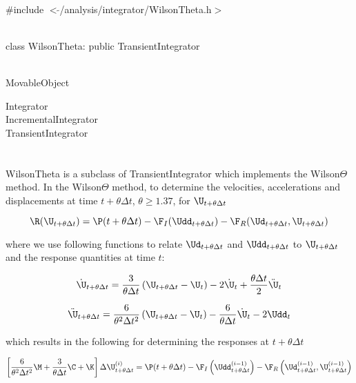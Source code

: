
   \\
\#include $<\tilde{ }$/analysis/integrator/WilsonTheta.h$>$  


  \\
class WilsonTheta: public TransientIntegrator  


 \\
MovableObject 

\indent\indent Integrator \\
\indent\indent\indent IncrementalIntegrator \\
\indent\indent\indent\indent TransientIntegrator \\
\indent\indent\indent\indent{} \\

 \\ 
\indent WilsonTheta is a subclass of TransientIntegrator which implements
the Wilson$\Theta$ method. In the Wilson$\Theta$ method, to determine the 
velocities, accelerations and displacements at time $t + \theta \Delta
t$, $\theta \ge 1.37$, for $\U_{t+ \theta \Delta t}$ 

\[ \R (\U_{t + \theta \Delta t}) = \P(t + \theta \Delta t) -
\F_I(\Udd_{t+ \theta \Delta t}) 
- \F_R(\Ud_{t + \theta \Delta t},\U_{t + \theta \Delta t}) \]

\noindent where we use following functions to relate $\Ud_{t + \theta
\Delta t}$ and $\Udd_{t + \theta \Delta t}$ to $\U_{t + \theta \Delta
t}$ and the response quantities at time $t$:

\[
\dot \U_{t + \theta \Delta t} = \frac{3}{\theta \Delta t} \left(
\U_{t + \theta \Delta t} - \U_t \right)
 - 2 \dot \U_t + \frac{\theta \Delta t}{2} \ddot \U_t 
\]

\[
\ddot \U_{t + \theta \Delta t} = \frac{6}{\theta^2 \Delta t^2}
\left( \U_{t+\theta \Delta t} - \U_t \right)
 - \frac{6}{\theta \Delta t} \dot \U_t -2 \Udd_t
\]

\noindent which  results in the following for determining the responses at
$t + \theta \Delta t$ 

\[ \left[ \frac{6}{\theta^2 \Delta t^2} \M + \frac{3}{\theta \Delta t}
\C + \K \right] \Delta \U_{t + \theta \Delta t}^{(i)} = \P(t + \theta
\Delta t) - \F_I\left(\Udd_{t+\theta \Delta  t}^{(i-1)}\right) 
- \F_R\left(\Ud_{t + \theta \Delta t}^{(i-1)},\U_{t + \theta \Delta
t}^{(i-1)}\right) \]


